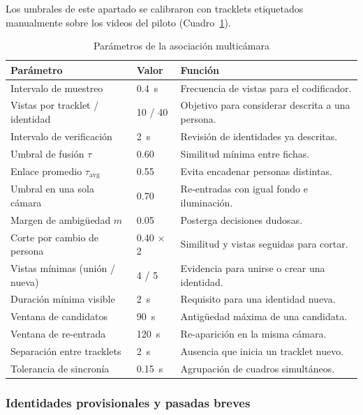 \documentclass[12pt,a4paper]{article}
\begin{document}
Los umbrales de este apartado se calibraron con tracklets etiquetados
manualmente sobre los videos del piloto (Cuadro~\ref{tab:assoc_params}).

\begin{table}[H]
\caption{Parámetros de la asociación multicámara}
\label{tab:assoc_params}
\centering
\footnotesize
\begin{tabular}{|p{}|p{}|p{}|}
\hline
\textbf{Parámetro} & \textbf{Valor} & \textbf{Función} \\
\hline
Intervalo de muestreo & 0.4~s & Frecuencia de vistas para el codificador. \\
\hline
Vistas por tracklet / identidad & 10 / 40 & Objetivo para considerar descrita a una persona. \\
\hline
Intervalo de verificación & 2~s & Revisión de identidades ya descritas. \\
\hline
Umbral de fusión $\tau$ & 0.60 & Similitud mínima entre fichas. \\
\hline
Enlace promedio $\tau_{\text{avg}}$ & 0.55 & Evita encadenar personas distintas. \\
\hline
Umbral en una sola cámara & 0.70 & Re-entradas con igual fondo e iluminación. \\
\hline
Margen de ambigüedad $m$ & 0.05 & Posterga decisiones dudosas. \\
\hline
Corte por cambio de persona & 0.40 $\times$ 2 & Similitud y vistas seguidas para cortar. \\
\hline
Vistas mínimas (unión / nueva) & 4 / 5 & Evidencia para unirse o crear una identidad. \\
\hline
Duración mínima visible & 2~s & Requisito para una identidad nueva. \\
\hline
Ventana de candidatos & 90~s & Antigüedad máxima de una candidata. \\
\hline
Ventana de re-entrada & 120~s & Re-aparición en la misma cámara. \\
\hline
Separación entre tracklets & 2~s & Ausencia que inicia un tracklet nuevo. \\
\hline
Tolerancia de sincronía & 0.15~s & Agrupación de cuadros simultáneos. \\
\hline
\end{tabular}
\end{table}

\subsubsection{Identidades provisionales y pasadas breves}
\end{document}

